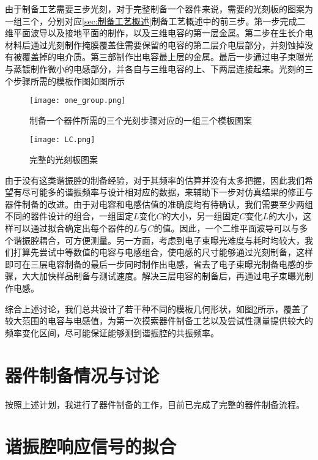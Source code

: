             由于制备工艺需要三步光刻，对于完整制备一个器件来说，需要的光刻板的图案为一组三个，分别对应\ref{sec:制备工艺概述}制备工艺概述中的前三步。第一步完成二维平面波导以及接地平面的制作，以及三维电容的第一层金属。第二步在生长介电材料后通过光刻制作掩膜覆盖住需要保留的电容的第二层介电层部分，并刻蚀掉没有被覆盖掉的电介质。第三部制作出电容最上层的金属。最后一步通过电子束曝光与蒸镀制作微小的电感部分，并各自与三维电容的上、下两层连接起来。光刻的三个步骤所需的模板作图如图所示
            

            \begin{figure}[h]
                \centering
                \texttt{[image: one\_group.png]}
                \caption{制备一个器件所需的三个光刻步骤对应的一组三个模板图案}
                \label{fig:one_group}
            \end{figure}

            \begin{figure}[h]
                \centering
                \texttt{[image: LC.png]}
                \caption{完整的光刻板图案}{}
                \label{fig:LC}
            \end{figure}

            由于没有这类谐振腔的制备经验，对于其频率的估算并没有太多把握，因此我们希望有尽可能多的谐振频率与设计相对应的数据，来辅助下一步对仿真结果的修正与器件制备的改进。由于对电容和电感估值的准确度均有待确认，我们需要至少两组不同的器件设计的组合，一组固定$L$变化$C$的大小，另一组固定$C$变化$L$的大小，这样可以通过拟合确定出每个器件的$L$与$C$的值。因此，一个二维平面波导可以与多个谐振腔耦合，可方便测量。另一方面，考虑到电子束曝光难度与耗时均较大，我们打算先尝试中等数值的电容与电感组合，使电感的尺寸能够通过光刻制备，这样即可在三层电容制备的最后一步同时制作出电感，省去了电子束曝光制备电感的步骤，大大加快样品制备与测试速度。解决三层电容的制备后，再通过电子束曝光制作电感。

            综合上述讨论，我们总共设计了若干种不同的模板几何形状，如图\ref{fig:LC}所示，覆盖了较大范围的电容与电感值，为第一次摸索器件制备工艺以及尝试性测量提供较大的频率变化区间，尽可能保证能够测到谐振腔的共振频率。


            \section{器件制备情况与讨论} %
            \label{sec:器件制备情况与讨论}
                按照上述计划，我进行了器件制备的工作，目前已完成了完整的器件制备流程。

                
            



            \section{谐振腔响应信号的拟合} %
            \label{sec:谐振腔响应信号的拟合}
            	









